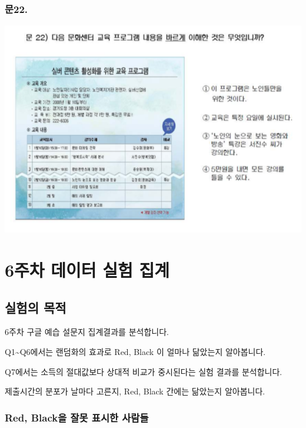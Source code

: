 \documentclass[
]{book}
\begin{document}
\subsection{문22.}\label{uxbb3822.}

\begin{flushleft}\includegraphics[width=0.75\linewidth]{./pics/Q22} \end{flushleft}

\chapter{6주차 데이터 실험 집계}\label{uxc8fcuxcc28-uxb370uxc774uxd130-uxc2e4uxd5d8-uxc9d1uxacc4-5}

\section{실험의 목적}\label{uxc2e4uxd5d8uxc758-uxbaa9uxc801-5}

6주차 구글 예습 설문지 집계결과를 분석합니다.

Q1\textasciitilde Q6에서는 랜덤화의 효과로 Red, Black 이 얼마나 닮았는지 알아봅니다.

Q7에서는 소득의 절대값보다 상대적 비교가 중시된다는 실험 결과를 분석합니다.

제출시간의 분포가 날마다 고른지, Red, Black 간에는 닮았는지 알아봅니다.

\subsection{Red, Black을 잘못 표시한 사람들}\label{red-blackuxc744-uxc798uxbabb-uxd45cuxc2dcuxd55c-uxc0acuxb78cuxb4e4-5}
\end{document}
